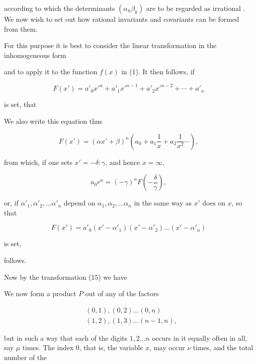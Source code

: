 

according to which the determinants $(\alpha_h\beta_k)$ are to be regarded as irrational . We now wish to set out how rational invariants and covariants can be formed from them.

For this purpose it is best to consider the linear transformation in the inhomogeneous form


and to apply it to the function $f(x)$ in (1). It then follows, if

\[
F(x') = a'_0 x'^n + a'_1 x'^{n-1} + a'_2 x'^{n-2} + \cdots + a'_n
\]

is set, that


We also write this equation thus

\[
F(x') = (\alpha x' + \beta)^n \left(a_0 + a_1 \frac{1}{x} + a_2 \frac{1}{x^2} \cdots\right),
\]

from which, if one sets $x' = -\delta : \gamma$, and hence $x = \infty$,

\[
a_0 r^n = (-\gamma)^n F\left(-\frac{\delta}{\gamma}\right),
\]

or, if $\alpha'_1, \alpha'_2, \ldots \alpha'_n$ depend on $\alpha_1, \alpha_2, \ldots \alpha_n$ in the same way as $x'$ does on $x$, so that

\[
F(x') = a'_0 (x' - \alpha'_1)(x' - \alpha'_2) \ldots (x' - \alpha'_n)
\]

is set,


follows.

Now by the transformation (15) we have


We now form a product $P$ out of any of the factors

\[
\begin{aligned}
&(0, 1), (0, 2) \ldots (0, n) \\
&(1, 2), (1, 3) \ldots (n - 1, n),
\end{aligned}
\]

but in such a way that each of the digits $1, 2 \ldots n$ occurs in it equally often in all, say $\mu$ times. The index $0$, that is, the variable $x$, may occur $\nu$ times, and the total number of the
